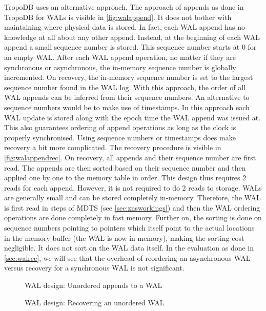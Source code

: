 TropoDB uses an alternative approach. The approach of appends as done in TropoDB for WALs is visible in \autoref{fig:walappend}. It does not bother with maintaining where physical data is stored. In fact, each WAL append has no knowledge at all about any other append. Instead, at the beginning of each WAL append a small sequence number is stored. This sequence number starts at 0 for an empty WAL. After each WAL append operation, no matter if they are synchronous or asynchronous, the in-memory sequence number is globally incremented. On recovery, the in-memory sequence number is set to the largest sequence number found in the WAL log. With this approach, the order of all WAL appends can be inferred from their sequence numbers. An alternative to sequence numbers would be to make use of timestamps. In this approach each WAL update is stored along with the epoch time the WAL append was issued at. This also guarantees ordering of append operations as long as the clock is properly synchronised. Using sequence numbers or timestamps does make recovery a bit more complicated. The recovery procedure is visible in \autoref{fig:walappendrec}. On recovery, all appends and their sequence number are first read. The appends are then sorted based on their sequence number and then applied one by one to the memory table in order. This design thus requires 2 reads for each append. However, it is not required to do 2 reads to storage. WALs are generally small and can be stored completely in-memory. Therefore, the WAL is first read in steps of MDTS (see \autoref{sec:znsworkings}) and then the WAL ordering operations are done completely in fast memory. Further on, the sorting is done on sequence numbers pointing to pointers which itself point to the actual locations in the memory buffer (the WAL is now in-memory), making the sorting cost negligible. It does not sort on the WAL data itself. In the evaluation as done in \autoref{sec:walrec}, we will see that the overhead of reordering an asynchronous WAL versus recovery for a synchronous WAL is not significant. 

\begin{figure}[h]
\centering
\begin{minipage}{0.75\textwidth}
  \centering
  
\end{minipage}%
\caption{ WAL design: Unordered appends to a WAL}
\label{fig:walappend}
\end{figure}

\begin{figure}[h]
\centering
\begin{minipage}{0.75\textwidth}
  \centering
  
\end{minipage}%
\caption{ WAL design: Recovering an unordered WAL}
\label{fig:walappendrec}
\end{figure}

